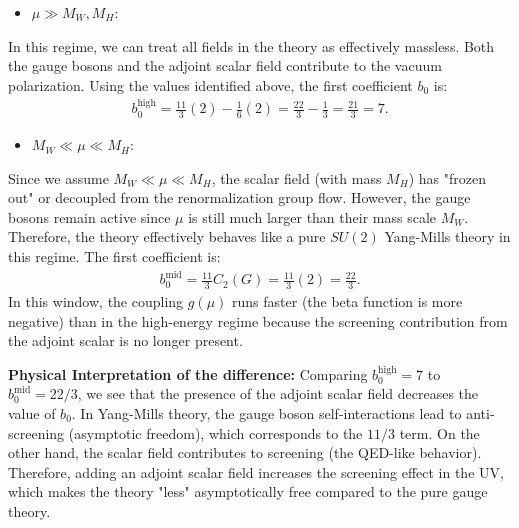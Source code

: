 \begin{itemize}
    \item [(a)] $\mu\gg M_W,M_H$: 
\end{itemize}
In this regime, we can treat all fields in the theory as effectively massless. Both the gauge bosons and the adjoint scalar field contribute to the vacuum polarization. Using the values identified above, the first coefficient $b_0$ is: 
\begin{align}
b_0^{\text{high}} = \frac{11}{3}(2) - \frac{1}{6}(2) = \frac{22}{3} - \frac{1}{3} = \frac{21}{3} = 7.
\end{align}

\begin{itemize}
    \item [(b)]  $M_W \ll \mu \ll M_H$:
\end{itemize}
Since we assume $M_W \ll \mu \ll M_H$, the scalar field (with mass $M_H$) has "frozen out" or decoupled from the renormalization group flow. However, the gauge bosons remain active since $\mu$ is still much larger than their mass scale $M_W$. Therefore, the theory effectively behaves like a pure $SU(2)$ Yang-Mills theory in this regime. The first coefficient is:
\begin{align}
    b_0^{\text{mid}} = \frac{11}{3}C_2(G) = \frac{11}{3}(2) = \frac{22}{3}.
\end{align}
In this window, the coupling $g(\mu)$ runs faster (the beta function is more negative) than in the high-energy regime because the screening contribution from the adjoint scalar is no longer present.


\textbf{Physical Interpretation of the difference:} Comparing $b_0^{\text{high}} = 7$ to $b_0^{\text{mid}} = 22/3$, we see that the presence of the adjoint scalar field decreases the value of $b_0$. In Yang-Mills theory, the gauge boson self-interactions lead to anti-screening (asymptotic freedom), which corresponds to the $11/3$ term. On the other hand, the scalar field contributes to screening (the QED-like behavior). Therefore, adding an adjoint scalar field increases the screening effect in the UV, which makes the theory "less" asymptotically free compared to the pure gauge theory.